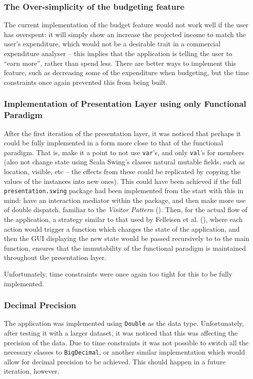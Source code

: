 \subsubsection{The Over-simplicity of the budgeting feature}
The current implementation of the budget feature would not work well if
the user has overspent: it will simply show an increase the projected income to
match the user's expenditure, which would not be a desirable trait in a
commercial expenditure analyser -- this implies that the application is telling
the user to ``earn more'', rather than spend less. There are better ways to
implement this feature, such as decreasing some of the expenditure when
budgeting, but the time constraints once again prevented this from being built.


\subsubsection{Implementation of Presentation Layer using only Functional Paradigm}
After the first iteration of the presentation layer, it was noticed that
perhaps it could be fully implemented in a form more close to that of the
functional paradigm. That is, make it a point to not use \texttt{var}'s, and
only \texttt{val}'s for members (also not change state using Scala Swing's
classes natural mutable fields, such as location, visible, etc -- the effects
from these could be replicated by copying the values of the instances into new
ones). This could have been achieved if the full \texttt{presentation.swing}
package had been implemented from the start with this in mind: have an
interaction mediator within the package, and then make more use of double
dispatch, familiar to the \emph{Visitor Pattern}
(\cite[][Ch.~8,~Location~3943]{nikolov2016scala}). Then, for the actual flow of
the application, a strategy similar to that used by Felleisen et al.
(\citeyear[][Ch.~5]{felleisen2013realm}), where each action would trigger a
function which changes the state of the application, and then the GUI
displaying the new state would be passed recursively to to the main function,
ensures that the immutability of the functional paradigm is maintained
throughout the presentation layer.

Unfortunately, time constraints were once again too tight for this to be fully
implemented.

\subsubsection{Decimal Precision}
The application was implemented using \texttt{Double} as the data type.
Unfortunately, after testing it with a larger dataset, it was noticed that this
was affecting the precision of the data. Due to time constraints it was not
possible to switch all the necessary classes to \texttt{BigDecimal}, or another
similar implementation which would allow for decimal precision to be achieved.
This should happen in a future iteration, however.

